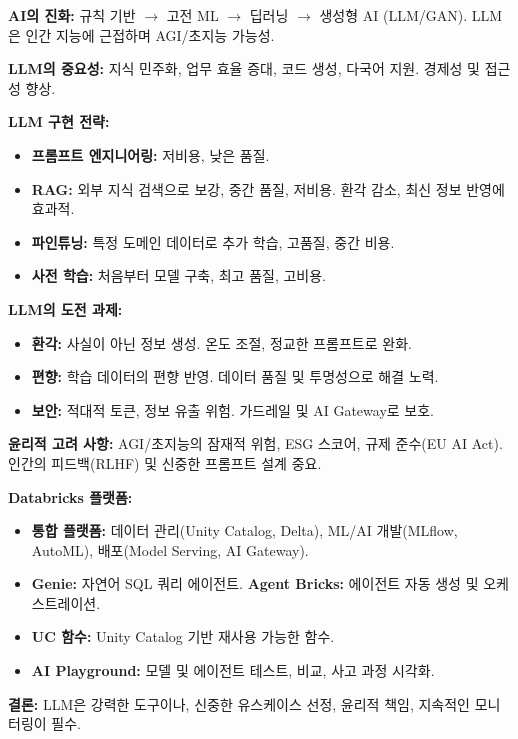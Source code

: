 \documentclass[11pt,a4paper]{article}
\theoremstyle{definition}
\begin{document}
\begin{tcolorbox}[summarybox={CSCI103 Lecture 11: LLM 및 에이전트 핵심 요약}]
    \textbf{AI의 진화:} 규칙 기반 $\rightarrow$ 고전 ML $\rightarrow$ 딥러닝 $\rightarrow$ 생성형 AI (LLM/GAN). LLM은 인간 지능에 근접하며 AGI/초지능 가능성.

    \textbf{LLM의 중요성:} 지식 민주화, 업무 효율 증대, 코드 생성, 다국어 지원. 경제성 및 접근성 향상.

    \textbf{LLM 구현 전략:}
    \begin{itemize}
        \item \textbf{프롬프트 엔지니어링:} 저비용, 낮은 품질.
        \item \textbf{RAG:} 외부 지식 검색으로 보강, 중간 품질, 저비용. 환각 감소, 최신 정보 반영에 효과적.
        \item \textbf{파인튜닝:} 특정 도메인 데이터로 추가 학습, 고품질, 중간 비용.
        \item \textbf{사전 학습:} 처음부터 모델 구축, 최고 품질, 고비용.
    \end{itemize}

    \textbf{LLM의 도전 과제:}
    \begin{itemize}
        \item \textbf{환각:} 사실이 아닌 정보 생성. 온도 조절, 정교한 프롬프트로 완화.
        \item \textbf{편향:} 학습 데이터의 편향 반영. 데이터 품질 및 투명성으로 해결 노력.
        \item \textbf{보안:} 적대적 토큰, 정보 유출 위험. 가드레일 및 AI Gateway로 보호.
    \end{itemize}

    \textbf{윤리적 고려 사항:} AGI/초지능의 잠재적 위험, ESG 스코어, 규제 준수(EU AI Act). 인간의 피드백(RLHF) 및 신중한 프롬프트 설계 중요.

    \textbf{Databricks 플랫폼:}
    \begin{itemize}
        \item \textbf{통합 플랫폼:} 데이터 관리(Unity Catalog, Delta), ML/AI 개발(MLflow, AutoML), 배포(Model Serving, AI Gateway).
        \item \textbf{Genie:} 자연어 SQL 쿼리 에이전트.
        \textbf{Agent Bricks:} 에이전트 자동 생성 및 오케스트레이션.
        \item \textbf{UC 함수:} Unity Catalog 기반 재사용 가능한 함수.
        \item \textbf{AI Playground:} 모델 및 에이전트 테스트, 비교, 사고 과정 시각화.
    \end{itemize}

    \textbf{결론:} LLM은 강력한 도구이나, 신중한 유스케이스 선정, 윤리적 책임, 지속적인 모니터링이 필수.
\end{tcolorbox}
\end{document}
